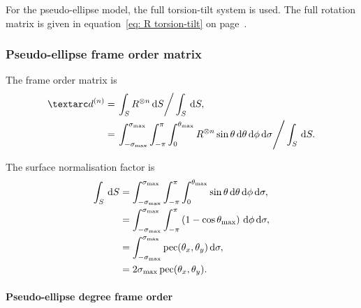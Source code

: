 For the pseudo-ellipse model, the full torsion-tilt system is used.
The full rotation matrix is given in equation~\ref{eq: R torsion-tilt} on page~\pageref{eq: R torsion-tilt}.



\subsubsection{Pseudo-ellipse frame order matrix}

The frame order matrix is
\begin{subequations}
\begin{align}
    \FOn &= \left. \int_S R^{\otimes n} \diff S \right / \int_S \diff S, \\
         &= \left. \int_{-\conesmax}^{\conesmax} \int_{-\pi}^{\pi} \int_{0}^{\conethetamax} R^{\otimes n} \sin\theta \diff\theta \diff\phi \diff\sigma  \right / \int_S \diff S .
\end{align}
\end{subequations}

The surface normalisation factor is
\begin{subequations}
\begin{align}
    \int_S \,\mathrm{d} S &= \int_{-\sigma_\textrm{max}}^{\sigma_\textrm{max}} \int_{-\pi}^{\pi} \int_{0}^{\theta_\textrm{max}} \sin\theta \,\mathrm{d}\theta \,\mathrm{d}\phi \,\mathrm{d}\sigma , \\
                   &= \int_{-\sigma_\textrm{max}}^{\sigma_\textrm{max}} \int_{-\pi}^{\pi} \left( 1 - \cos\theta_\textrm{max} \right) \,\mathrm{d}\phi \,\mathrm{d}\sigma , \label{eq: pseudo-ellipse surface norm non-integratable} \\
                   &= \int_{-\sigma_\textrm{max}}^{\sigma_\textrm{max}} \operatorname{pec}(\theta_x, \theta_y) \,\mathrm{d}\sigma , \\
                   &= 2\sigma_\textrm{max} \operatorname{pec}(\theta_x, \theta_y) .
\end{align}
\end{subequations}

\paragraph{Pseudo-ellipse  degree frame order}

